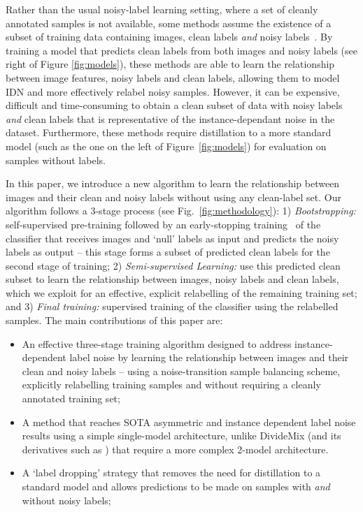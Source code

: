 \documentclass[10pt,twocolumn,letterpaper]{article}
\begin{document}
Rather than the usual noisy-label learning setting, where a set of cleanly annotated samples is not available, some methods assume the existence of a subset of training data containing images, clean labels \textit{and} noisy labels~\cite{inoue2017multi,veit2017learning,gu2021instancedependent}. By training a model that predicts clean labels from both images and noisy labels (see right of Figure \ref{fig:models}), these methods are able to learn the relationship between image features, noisy labels and clean labels, allowing them to model IDN and more effectively relabel noisy samples. However, it can be expensive, difficult and time-consuming to obtain a clean subset of data with noisy labels \textit{and} clean labels that is representative of the instance-dependant noise in the dataset. 
Furthermore, these methods require distillation to a more standard model (such as the one on the left of Figure~\ref{fig:models}) for evaluation on samples without labels.

In this paper, we introduce a new algorithm to learn the relationship between images and their clean and noisy labels without using any clean-label set.
Our algorithm follows a 3-stage process (see Fig.~\ref{fig:methodology}): 
1) \textit{Bootstrapping:} self-supervised pre-training followed by an early-stopping training~\cite{zhang2016understanding} of the classifier that receives images and `null' labels as input and predicts the noisy labels as output -- this stage forms a subset of predicted clean labels for the second stage of training;
2) \textit{Semi-supervised Learning:} use this predicted clean subset to learn the relationship between images, noisy labels and clean labels, which we exploit for an effective, explicit relabelling of the remaining training set;
and 3) \textit{Final training:} supervised training of the classifier using the relabelled samples. The main contributions of this paper are:
\begin{itemize}
    \item An effective three-stage training algorithm designed to address instance-dependent label noise by learning the relationship between images and their clean and noisy labels -- using a noise-transition sample balancing scheme, explicitly relabelling training samples and without requiring a cleanly annotated training set;
    \item A method that reaches SOTA asymmetric and instance dependent label noise results using a simple single-model architecture, unlike DivideMix \cite{li2020dividemix} (and its derivatives such as \cite{sachdeva2021scanmix, zheltonozhskii2022contrast, Nishi_2021_CVPR, cordeiro2021propmix, kim2021fine}) that require a more complex 2-model architecture.
    \item A `label dropping' strategy that removes the need for distillation to a standard model and allows predictions to be made on samples with \textit{and} without noisy labels;
\end{itemize}
\end{document}
